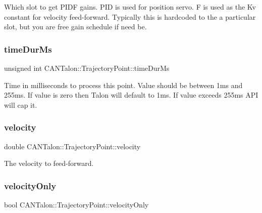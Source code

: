 Which slot to get P\+I\+DF gains. P\+ID is used for position servo. F is used as the Kv constant for velocity feed-\/forward. Typically this is hardcoded to the a particular slot, but you are free gain schedule if need be. \mbox{\label{struct_c_a_n_talon_1_1_trajectory_point_ab42e89d7ca0228d874ff2786dd632cb1}} 
\subsubsection{\texorpdfstring{time\+Dur\+Ms}{timeDurMs}}
{\footnotesize\ttfamily unsigned int C\+A\+N\+Talon\+::\+Trajectory\+Point\+::time\+Dur\+Ms}

Time in milliseconds to process this point. Value should be between 1ms and 255ms. If value is zero then Talon will default to 1ms. If value exceeds 255ms A\+PI will cap it. \mbox{\label{struct_c_a_n_talon_1_1_trajectory_point_a4be656118b6bd54bc33ceb55ab1aac6b}} 
\subsubsection{\texorpdfstring{velocity}{velocity}}
{\footnotesize\ttfamily double C\+A\+N\+Talon\+::\+Trajectory\+Point\+::velocity}



The velocity to feed-\/forward. 

\mbox{\label{struct_c_a_n_talon_1_1_trajectory_point_a6d15bfa2f22505ffc2ec14774c2705a0}} 
\subsubsection{\texorpdfstring{velocity\+Only}{velocityOnly}}
{\footnotesize\ttfamily bool C\+A\+N\+Talon\+::\+Trajectory\+Point\+::velocity\+Only}

